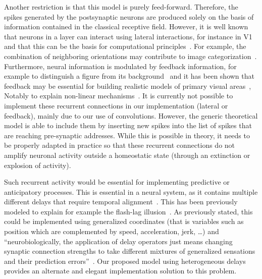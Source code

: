 \documentclass[default]{sn-jnl}%
\theoremstyle{thmstyleone}%
\theoremstyle{thmstyletwo}%
\theoremstyle{thmstylethree}%
\newcommand{\note}[1]{{\sethlcolor{yellow}\hl{#1}}}
\begin{document}
Another restriction is that this model is purely feed-forward. Therefore, the spikes generated by the postsynaptic neurons are produced solely on the basis of information contained in the classical receptive field. However, it is well known that neurons in a layer can interact using lateral interactions, for instance in V1 and that this can be the basis for computational principles~\citep{chavane_revisiting_2022}. For example, the combination of neighboring orientations may contribute to image categorization~\citep{perrinet_edge_2015}. Furthermore, neural information is modulated by feedback information, for example to distinguish a figure from its background~\citep{roelfsema_early_2016} and it has been shown that feedback may be essential for building realistic models of primary visual areas~\citep{boutin_sparse_2020, boutin_effect_2020}, Notably to explain non-linear mechanisms~\citep{boutin_pooling_2022}. It is currently not possible to implement these recurrent connections in our implementation (lateral or feedback), mainly due to our use of convolutions. However, the generic theoretical model is able to include them by inserting new spikes into the list of spikes that are reaching pre-synaptic addresses. While this is possible in theory, it needs to be properly adapted in practice so that these recurrent connections do not amplify neuronal activity outside a homeostatic state (through an extinction or explosion of activity).  

Such recurrent activity would be essential for implementing predictive or anticipatory processes. This is essential in a neural system, as it contains multiple different delays that require temporal alignment~\citep{hogendoorn_predictive_2019}. This has been previously modeled to explain for example the flash-lag illusion~\citep{khoei_flash-lag_2017}. %
As previously stated, this could be implemented using generalized coordinates (that is variables such as position which are complemented by speed, acceleration, jerk, \ldots) and ``neurobiologically, the application of delay operators just means changing synaptic connection strengths to take different mixtures of generalized sensations and their prediction errors''~\citep{perrinet_active_2014}. Our proposed model using heterogeneous delays provides an alternate and elegant implementation solution to this problem.
%
\end{document}

